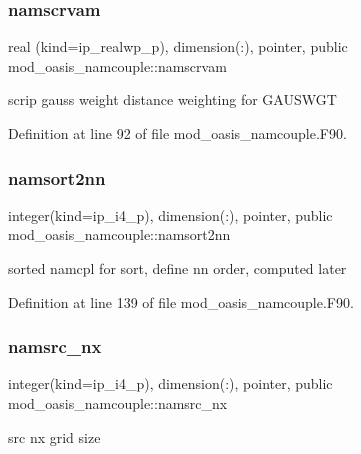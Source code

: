 \subsubsection{\texorpdfstring{namscrvam}{namscrvam}}
{\footnotesize\ttfamily real (kind=ip\+\_\+realwp\+\_\+p), dimension(\+:), pointer, public mod\+\_\+oasis\+\_\+namcouple\+::namscrvam}



scrip gauss weight distance weighting for G\+A\+U\+S\+W\+GT 



Definition at line 92 of file mod\+\_\+oasis\+\_\+namcouple.\+F90.

\mbox{\label{namespacemod__oasis__namcouple_a4555b14f38928b7f0fb7f77b9c42d0a0}} 
\subsubsection{\texorpdfstring{namsort2nn}{namsort2nn}}
{\footnotesize\ttfamily integer(kind=ip\+\_\+i4\+\_\+p), dimension(\+:), pointer, public mod\+\_\+oasis\+\_\+namcouple\+::namsort2nn}



sorted namcpl for sort, define nn order, computed later 



Definition at line 139 of file mod\+\_\+oasis\+\_\+namcouple.\+F90.

\mbox{\label{namespacemod__oasis__namcouple_ac8f6c8fe3720739f3d26431a8a600506}} 
\subsubsection{\texorpdfstring{namsrc\+\_\+nx}{namsrc\_nx}}
{\footnotesize\ttfamily integer(kind=ip\+\_\+i4\+\_\+p), dimension(\+:), pointer, public mod\+\_\+oasis\+\_\+namcouple\+::namsrc\+\_\+nx}



src nx grid size 



